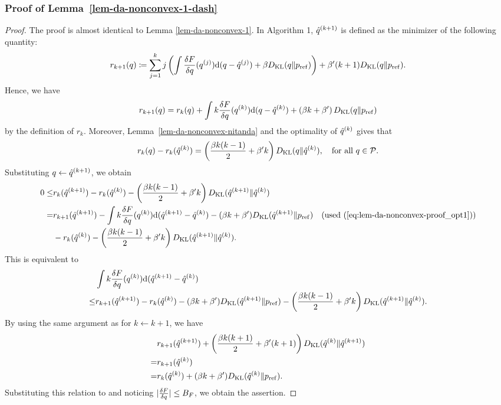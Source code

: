 \subsubsection{Proof of Lemma~\ref{lem-da-nonconvex-1-dash}}\label{sec:da-nonconvex-proof-1-dash}

\begin{proof}
    The proof is almost identical to Lemma \ref{lem-da-nonconvex-1}. 
    In Algorithm 1, $\hat{q}^{(k+1)}$ is defined as the minimizer of the following quantity: 
    \begin{equation}
        r_{k+1}(q) \coloneq \sum_{j=1}^k j \left( \int   \frac{\delta F}{\delta q}(q^{(j)})\mathrm{d}(q-\hat{q}^{(j)})  + \beta D_{\mathrm{KL}}(q \| p_{\rm{ref}}) \right)
        + \beta' (k+1) D_{\mathrm{KL}}(q\|p_{\rm{ref}}).
    \end{equation}
    Hence, we have 
    \begin{equation}
        r_{k+1}(q) = r_k(q) + \int k \frac{\delta F}{\delta q}(q^{(k)}) \mathrm{d}(q-\hat{q}^{(k)})
        + \left(\beta k  + \beta' \right) D_{\mathrm{KL}}(q\|p_{\rm{ref}}) \label{eq:lem-da-nonconvex-proof_opt1}
    \end{equation}
    by the definition of $r_k$. Moreover, Lemma~\ref{lem-da-nonconvex-nitanda} and the optimality of $\hat{q}^{(k)}$ gives that  
    \begin{equation}\label{eq:rkupdateDiff2}
        r_k(q) - r_k(\hat{q}^{(k)}) =  \left( \frac{\beta k(k-1)}{2} + \beta' k \right) D_{\mathrm{KL}}(q\|\hat{q}^{(k)}), \quad \text{for all $q\in{\mathcal{P}}$.}
    \end{equation}
    Substituting $q \leftarrow \hat{q}^{(k+1)}$, we obtain
    \begin{align}
        0 \leq& r_k(\hat{q}^{(k+1)}) - r_k(\hat{q}^{(k)}) -  \left( \frac{\beta k(k-1)}{2} + \beta' k \right) D_{\mathrm{KL}}(\hat{q}^{(k+1)}\|\hat{q}^{(k)}) \\
        =& r_{k+1}(\hat{q}^{(k+1)}) -  \int k \frac{\delta F}{\delta q}(q^{(k)}) \mathrm{d}(\hat{q}^{(k+1)}-\hat{q}^{(k)})
        -( \beta k + \beta') D_{\mathrm{KL}}(\hat{q}^{(k+1)}\|p_{\rm{ref}}) \quad (\text{used (\ref{eq:lem-da-nonconvex-proof_opt1})})\\
        &-r_k(\hat{q}^{(k)}) -  \left( \frac{\beta k(k-1)}{2} + \beta' k \right) D_{\mathrm{KL}}(\hat{q}^{(k+1)}\|\hat{q}^{(k)}).\label{eq:rkinductionFirstSide2}
    \end{align}
    This is equivalent to 
    \begin{align}
        &\int k \frac{\delta F}{\delta q}(q^{(k)}) \mathrm{d}(\hat{q}^{(k+1)}-\hat{q}^{(k)})\\
        \leq& r_{k+1}(\hat{q}^{(k+1)}) -r_k(\hat{q}^{(k)}) 
        -(\beta k + \beta') D_{\mathrm{KL}}(\hat{q}^{(k+1)}\|p_{\rm{ref}})
        - \left( \frac{\beta k(k-1)}{2} + \beta' k \right) D_{\mathrm{KL}}(\hat{q}^{(k+1)}\|\hat{q}^{(k)}).
    \end{align}
    By using the same argument as  for $k \leftarrow k+1$, we have 
    \begin{align}
        & r_{k+1}(\hat{q}^{(k+1)})
        + \left( \frac{\beta k(k+1)}{2} + \beta' (k+1) \right) D_{\mathrm{KL}}(\hat{q}^{(k)}\|\hat{q}^{(k+1)})  \\
        =& r_{k+1}(\hat{q}^{(k)})\\
        =&r_k(\hat{q}^{(k)}) + (\beta k + \beta') D_{\mathrm{KL}}(\hat{q}^{(k)}\|p_{\rm{ref}}).
    \end{align}
    Substituting this relation to  and noticing $|\frac{\delta F}{\delta q}|\leq B_F$, we obtain the assertion. 
\end{proof}
